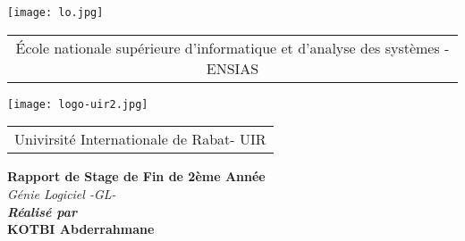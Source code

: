 \documentclass[a4paper, oneside, french, 12pt, final]{extreport}
\title{\reportSubject}
\author{\reportAuthor}
\newcommand{\reportTitle} {%
  \textsc{Graduation Project Report}
}
\begin{document}
\thispagestyle{empty}
\begin{titlepage}
  \begin{center}


    \texttt{[image: lo.jpg]}\\

    {%
    \fontsize{9pt}{9pt}\selectfont%
    \begin{tabular}{c}
      École nationale supérieure d’informatique
      et d’analyse des systèmes - ENSIAS \\
    \end{tabular}
    }

    \vspace{10pt}
    \texttt{[image: logo-uir2.jpg]} \\

    {%
    \fontsize{9pt}{9pt}\selectfont%
    \begin{tabular}{c}
      Univirsité Internationale de Rabat- UIR \\
    \end{tabular}
    }



    \vspace{10pt} {%
      \renewcommand*{\familydefault}{\defaultFont}
      \fontsize{46pt}{46pt}\selectfont%
    }

    \vspace{10pt}
    \textbf{\large Rapport de Stage de Fin de 2ème Année} \\

    \vspace{10pt}
    \textit{
      Génie Logiciel -GL-
    }\\


    \vspace{10pt}
    \textbf{\textit{Réalisé par}}\\
    \vspace{10pt} {%
      \fontsize{18pt}{18pt}\selectfont%
      \textbf{KOTBI Abderrahmane}\\
    }%


\end{center}
\end{titlepage}
\end{document}
